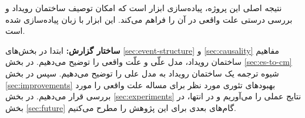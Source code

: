 نتیجه اصلی این پروژه، پیاده‌سازی ابزار
است که امکان توصیف ساختمان رویداد
و بررسی درستی علت واقعی در آن را فراهم می‌کند.
این ابزار با زبان
پیاده‌سازی شده است.

\textbf{ساختار گزارش:}
ابتدا در بخش‌های
\ref{sec:event-structure} و \ref{sec:causality}
مفاهیم ساختمان رویداد، مدل علّی
و علّت واقعی را توضیح می‌دهیم.
در بخش
\ref{sec:es-to-cm}
شیوه ترجمه یک ساختمان رویداد
به مدل علی را توضیح می‌دهیم.
سپس در بخش
\ref{sec:improvements}
بهبودهای تئوری مورد نظر برای مساله
علت واقعی را مورد بررسی قرار می‌دهیم.
در بخش
\ref{sec:experiments}
نتایج عملی را می‌آوریم
و در انتها، در بخش
\ref{sec:future}
گام‌های بعدی برای این پژوهش را مطرح می‌کنیم.
